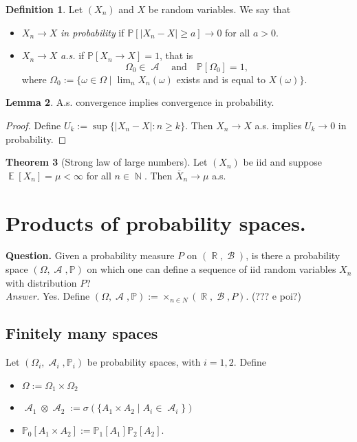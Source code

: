 \documentclass[12pt,a4paper]{report}
\theoremstyle{definition}
\newtheorem{theorem}{Theorem}[chapter] %
\newtheorem{lemma}[theorem]{Lemma}
\newtheorem{definition}[theorem]{Definition}
\theoremstyle{num.custom-title}
\DeclareMathOperator{\A}{\mathcal{A}}
\DeclareMathOperator{\B}{\mathcal{B}}
\DeclareMathOperator{\E}{\mathbb{E}}
\DeclareMathOperator{\N}{\mathbb{N}}
\DeclareMathOperator{\R}{\mathbb{R}}
\newcommand{\ol}{\overline}
\renewcommand{\1}{\mathbbm{1}}
\renewcommand{\P}{\mathbb{P}}
\begin{document}
\begin{definition}
Let $(X_n)$ and $X$ be random variables. We say that
\begin{itemize}
\item $X_n \to X$ \emph{in probability} if $\P[|X_n-X| \geq a] \to 0$ for all $a>0$.
\item $X_n \to X$ \emph{a.s.} if $\P[X_n \to X]=1$, that is
\[
\Omega_0 \in \A \quad \text{and} \quad \P[\Omega_0] = 1,
\]
where $\Omega_0 := \{\omega \in \Omega \mid \lim_n X_n(\omega)$ exists and is equal to $X(\omega)\}$.
\end{itemize}
\end{definition}

\begin{lemma}
A.s. convergence implies convergence in probability.
\begin{proof}
Define $U_k := \sup\{|X_n-X| : n \geq k\}$. Then $X_n \to X$ a.s. implies $U_k \to 0$ in probability.
\end{proof}
\end{lemma}

\begin{theorem}[Strong law of large numbers]
Let $(X_n)$ be iid and suppose $\E[X_n] = \mu < \infty$ for all $n \in \N$. Then $\ol{X}_n \to \mu$ a.s.
\end{theorem}

\section{Products of probability spaces.}

\textbf{Question.} Given a probability measure $P$ on $(\R,\B)$, is there a probability space $(\Omega,\A,\P)$ on which one can define a sequence of iid random variables $X_n$ with distribution $P$?\\
\textit{Answer.} Yes. Define $(\Omega,\A,\P) := \times_{n \in N} (\R,\B,P)$. (??? e poi?)

\subsection{Finitely many spaces}

Let $(\Omega_i,\A_i,\P_i)$ be probability spaces, with $i=1,2$. Define
\begin{itemize}
\item $\Omega := \Omega_1 \times \Omega_2$
\item $\A_1 \otimes \A_2 := \sigma(\{A_1 \times A_2 \mid A_i \in \A_i\})$
\item $\P_0[A_1 \times A_2] := \P_1[A_1] \P_2[A_2]$.
\end{itemize}
\end{document}
